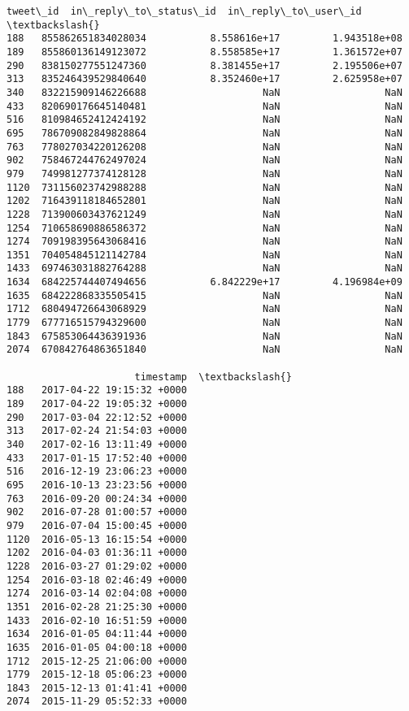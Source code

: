 \documentclass[11pt]{article}
\makeatletter
\newcommand{\boxspacing}{\kern\kvtcb@left@rule\kern\kvtcb@boxsep}
\newcommand{\prompt}[4]{
        \ttfamily\llap{{\color{#2}[#3]:\hspace{3pt}#4}}\vspace{-\baselineskip}
    }
\makeatother
\begin{document}
            \begin{tcolorbox}[breakable, size=fbox, boxrule=.5pt, pad at break*=1mm, opacityfill=0]
\prompt{Out}{outcolor}{98}{\boxspacing}
\begin{Verbatim}[commandchars=\\\{\}]
                tweet\_id  in\_reply\_to\_status\_id  in\_reply\_to\_user\_id  \textbackslash{}
188   855862651834028034           8.558616e+17         1.943518e+08
189   855860136149123072           8.558585e+17         1.361572e+07
290   838150277551247360           8.381455e+17         2.195506e+07
313   835246439529840640           8.352460e+17         2.625958e+07
340   832215909146226688                    NaN                  NaN
433   820690176645140481                    NaN                  NaN
516   810984652412424192                    NaN                  NaN
695   786709082849828864                    NaN                  NaN
763   778027034220126208                    NaN                  NaN
902   758467244762497024                    NaN                  NaN
979   749981277374128128                    NaN                  NaN
1120  731156023742988288                    NaN                  NaN
1202  716439118184652801                    NaN                  NaN
1228  713900603437621249                    NaN                  NaN
1254  710658690886586372                    NaN                  NaN
1274  709198395643068416                    NaN                  NaN
1351  704054845121142784                    NaN                  NaN
1433  697463031882764288                    NaN                  NaN
1634  684225744407494656           6.842229e+17         4.196984e+09
1635  684222868335505415                    NaN                  NaN
1712  680494726643068929                    NaN                  NaN
1779  677716515794329600                    NaN                  NaN
1843  675853064436391936                    NaN                  NaN
2074  670842764863651840                    NaN                  NaN

                      timestamp  \textbackslash{}
188   2017-04-22 19:15:32 +0000
189   2017-04-22 19:05:32 +0000
290   2017-03-04 22:12:52 +0000
313   2017-02-24 21:54:03 +0000
340   2017-02-16 13:11:49 +0000
433   2017-01-15 17:52:40 +0000
516   2016-12-19 23:06:23 +0000
695   2016-10-13 23:23:56 +0000
763   2016-09-20 00:24:34 +0000
902   2016-07-28 01:00:57 +0000
979   2016-07-04 15:00:45 +0000
1120  2016-05-13 16:15:54 +0000
1202  2016-04-03 01:36:11 +0000
1228  2016-03-27 01:29:02 +0000
1254  2016-03-18 02:46:49 +0000
1274  2016-03-14 02:04:08 +0000
1351  2016-02-28 21:25:30 +0000
1433  2016-02-10 16:51:59 +0000
1634  2016-01-05 04:11:44 +0000
1635  2016-01-05 04:00:18 +0000
1712  2015-12-25 21:06:00 +0000
1779  2015-12-18 05:06:23 +0000
1843  2015-12-13 01:41:41 +0000
2074  2015-11-29 05:52:33 +0000


\end{Verbatim}
\end{tcolorbox}
\end{document}

